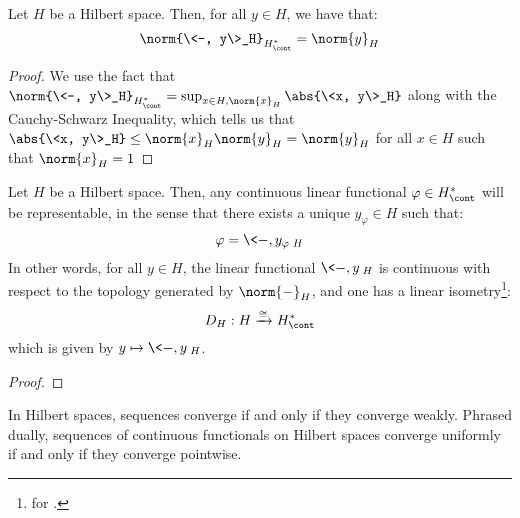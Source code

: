         \begin{lemma} \label{lemma: norms_of_dual_elements_in_hilbert_spaces}
            Let $H$ be a Hilbert space. Then, for all $y \in H$, we have that:
                $$\norm{\<-, y\>_H}_{H^*_{\cont}} = \norm{y}_H$$
        \end{lemma}
            \begin{proof}
                We use the fact that $\norm{\<-, y\>_H}_{H^*_{\cont}} = \sup_{x \in H, \norm{x}_H} \abs{\<x, y\>_H}$ along with the Cauchy-Schwarz Inequality, which tells us that $\abs{\<x, y\>_H} \leq \norm{x}_H \norm{y}_H = \norm{y}_H$ for all $x \in H$ such that $\norm{x}_H = 1$
            \end{proof}
        \begin{theorem} \label{theorem: riesz_representation_theorem}
            Let $H$ be a Hilbert space. Then, any continuous linear functional $\varphi \in H^*_{\cont}$ will be representable, in the sense that there exists a unique $y_{\varphi} \in H$ such that:
                $$\varphi = \<-, y_{\varphi}\>_H$$
            In other words, for all $y \in H$, the linear functional $\<-, y\>_H$ is continuous with respect to the topology generated by $\norm{-}_H$, and one has a linear isometry\footnote{ for .}:
                $$D_H: H \xrightarrow[]{\cong} H^*_{\cont}$$
            which is given by $y \mapsto \<-, y\>_H$.
        \end{theorem}
            \begin{proof}
            \end{proof}
        \begin{corollary} \label{coro: hilbert_space_uniformity}
            In Hilbert spaces, sequences converge if and only if they converge weakly. Phrased dually, sequences of continuous functionals on Hilbert spaces converge uniformly if and only if they converge pointwise.
        \end{corollary}
